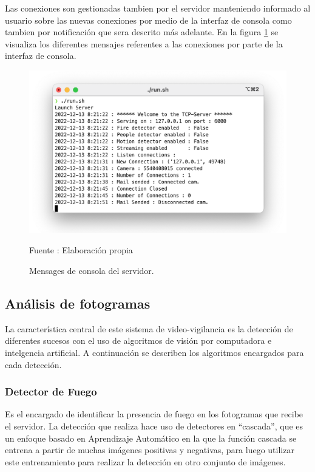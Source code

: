 Las conexiones son gestionadas tambien por el servidor manteniendo informado al usuario sobre las nuevas conexiones por medio de la interfaz de consola como tambien por notificación que sera descrito más adelante. En la figura \ref{fig:server_messages} se visualiza los diferentes mensajes referentes a las conexiones por parte de la interfaz de consola.\\

\begin{figure}[H]
    \begin{center}
        \includegraphics[width=12cm]{img/capitulo_5/server_messages.png}
    \end{center}
    \begin{center}
        \caption{Mensages de consola del servidor.}
        Fuente : Elaboración propia
        \label{fig:server_messages}
    \end{center}
\end{figure}

\subsection{Análisis de fotogramas}
La característica central de este sistema de video-vigilancia es la detección de diferentes sucesos con el uso de algoritmos de visión por computadora e intelgencia artificial. A continuación se describen los algoritmos encargados para cada detección.\\
\subsubsection{Detector de Fuego}
Es el encargado de identificar la presencia de fuego en los fotogramas que recibe el servidor. La detección que realiza hace uso de detectores en ``cascada'', que es un enfoque basado en Aprendizaje Automático en la que la función cascada se entrena a partir de muchas imágenes positivas y negativas, para luego utilizar este entrenamiento para realizar la detección en otro conjunto de imágenes.\\

